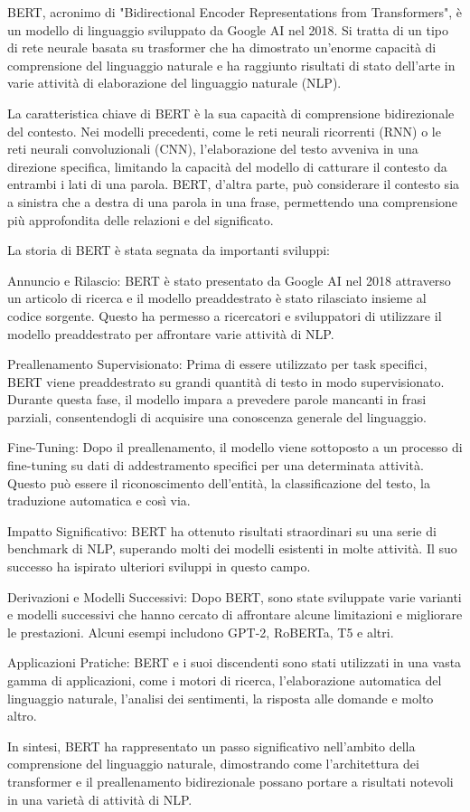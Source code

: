 BERT, acronimo di "Bidirectional Encoder Representations from Transformers", è un modello di linguaggio sviluppato da Google AI nel 2018. Si tratta di un tipo di rete neurale basata su trasformer che ha dimostrato un'enorme capacità di comprensione del linguaggio naturale e ha raggiunto risultati di stato dell'arte in varie attività di elaborazione del linguaggio naturale (NLP).

La caratteristica chiave di BERT è la sua capacità di comprensione bidirezionale del contesto. Nei modelli precedenti, come le reti neurali ricorrenti (RNN) o le reti neurali convoluzionali (CNN), l'elaborazione del testo avveniva in una direzione specifica, limitando la capacità del modello di catturare il contesto da entrambi i lati di una parola. BERT, d'altra parte, può considerare il contesto sia a sinistra che a destra di una parola in una frase, permettendo una comprensione più approfondita delle relazioni e del significato.

La storia di BERT è stata segnata da importanti sviluppi:

Annuncio e Rilascio: BERT è stato presentato da Google AI nel 2018 attraverso un articolo di ricerca e il modello preaddestrato è stato rilasciato insieme al codice sorgente. Questo ha permesso a ricercatori e sviluppatori di utilizzare il modello preaddestrato per affrontare varie attività di NLP.

Preallenamento Supervisionato: Prima di essere utilizzato per task specifici, BERT viene preaddestrato su grandi quantità di testo in modo supervisionato. Durante questa fase, il modello impara a prevedere parole mancanti in frasi parziali, consentendogli di acquisire una conoscenza generale del linguaggio.

Fine-Tuning: Dopo il preallenamento, il modello viene sottoposto a un processo di fine-tuning su dati di addestramento specifici per una determinata attività. Questo può essere il riconoscimento dell'entità, la classificazione del testo, la traduzione automatica e così via.

Impatto Significativo: BERT ha ottenuto risultati straordinari su una serie di benchmark di NLP, superando molti dei modelli esistenti in molte attività. Il suo successo ha ispirato ulteriori sviluppi in questo campo.

Derivazioni e Modelli Successivi: Dopo BERT, sono state sviluppate varie varianti e modelli successivi che hanno cercato di affrontare alcune limitazioni e migliorare le prestazioni. Alcuni esempi includono GPT-2, RoBERTa, T5 e altri.

Applicazioni Pratiche: BERT e i suoi discendenti sono stati utilizzati in una vasta gamma di applicazioni, come i motori di ricerca, l'elaborazione automatica del linguaggio naturale, l'analisi dei sentimenti, la risposta alle domande e molto altro.

In sintesi, BERT ha rappresentato un passo significativo nell'ambito della comprensione del linguaggio naturale, dimostrando come l'architettura dei transformer e il preallenamento bidirezionale possano portare a risultati notevoli in una varietà di attività di NLP.